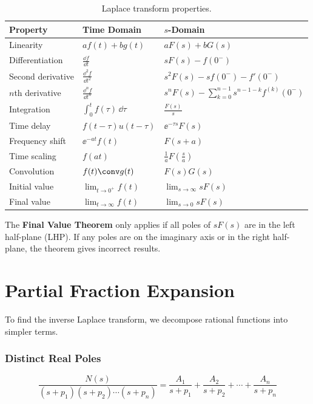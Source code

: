 \begin{table}[htbp]
\centering
\begin{tabular}{lll}
\toprule
\textbf{Property} & \textbf{Time Domain} & \textbf{$s$-Domain} \\
\midrule
Linearity & $af(t) + bg(t)$ & $aF(s) + bG(s)$ \\
Differentiation & $\frac{\dd f}{\dd t}$ & $sF(s) - f(0^-)$ \\
Second derivative & $\frac{\dd^2 f}{\dd t^2}$ & $s^2F(s) - sf(0^-) - f'(0^-)$ \\
$n$th derivative & $\frac{\dd^n f}{\dd t^n}$ & $s^nF(s) - \sum_{k=0}^{n-1} s^{n-1-k}f^{(k)}(0^-)$ \\
Integration & $\int_0^t f(\tau)\,\dd\tau$ & $\frac{F(s)}{s}$ \\
Time delay & $f(t-\tau)u(t-\tau)$ & $\ee^{-\tau s}F(s)$ \\
Frequency shift & $\ee^{-at}f(t)$ & $F(s+a)$ \\
Time scaling & $f(at)$ & $\frac{1}{a}F\left(\frac{s}{a}\right)$ \\
Convolution & $f(t) \conv g(t)$ & $F(s)G(s)$ \\
Initial value & $\lim_{t\to 0^+} f(t)$ & $\lim_{s\to\infty} sF(s)$ \\
Final value & $\lim_{t\to\infty} f(t)$ & $\lim_{s\to 0} sF(s)$ \\
\bottomrule
\end{tabular}
\caption{Laplace transform properties.}
\label{tab:laplace_properties}
\end{table}

\begin{warningbox}
The \textbf{Final Value Theorem} only applies if all poles of $sF(s)$ are in the left half-plane (LHP). If any poles are on the imaginary axis or in the right half-plane, the theorem gives incorrect results.
\end{warningbox}

\section{Partial Fraction Expansion}

To find the inverse Laplace transform, we decompose rational functions into simpler terms.

\subsubsection{Distinct Real Poles}
\begin{equation}
\frac{N(s)}{(s+p_1)(s+p_2)\cdots(s+p_n)} = \frac{A_1}{s+p_1} + \frac{A_2}{s+p_2} + \cdots + \frac{A_n}{s+p_n}
\end{equation}

